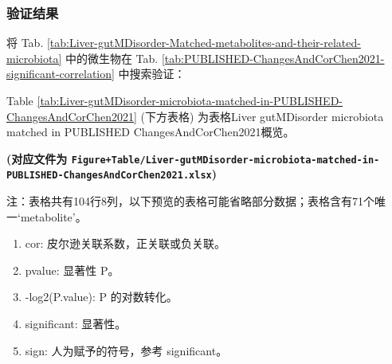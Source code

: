 \documentclass[
]{article}
\providecommand{\tightlist}{%
  \setlength{\itemsep}{0pt}\setlength{\parskip}{0pt}}
\begin{document}
\hypertarget{ux9a8cux8bc1ux7ed3ux679c}{%
\subsubsection{验证结果}\label{ux9a8cux8bc1ux7ed3ux679c}}

将 Tab. \ref{tab:Liver-gutMDisorder-Matched-metabolites-and-their-related-microbiota} 中的微生物在 Tab. \ref{tab:PUBLISHED-ChangesAndCorChen2021-significant-correlation} 中搜索验证：

Table \ref{tab:Liver-gutMDisorder-microbiota-matched-in-PUBLISHED-ChangesAndCorChen2021} (下方表格) 为表格Liver gutMDisorder microbiota matched in PUBLISHED ChangesAndCorChen2021概览。

\textbf{(对应文件为 \texttt{Figure+Table/Liver-gutMDisorder-microbiota-matched-in-PUBLISHED-ChangesAndCorChen2021.xlsx})}

\begin{center}\begin{tcolorbox}[colback=gray!10, colframe=gray!50, width=0.9\linewidth, arc=1mm, boxrule=0.5pt]注：表格共有104行8列，以下预览的表格可能省略部分数据；表格含有71个唯一`metabolite'。
\end{tcolorbox}
\end{center}
\begin{center}\begin{tcolorbox}[colback=gray!10, colframe=gray!50, width=0.9\linewidth, arc=1mm, boxrule=0.5pt]\begin{enumerate}\tightlist
\item cor:  皮尔逊关联系数，正关联或负关联。
\item pvalue:  显著性 P。
\item -log2(P.value):  P 的对数转化。
\item significant:  显著性。
\item sign:  人为赋予的符号，参考 significant。
\end{enumerate}\end{tcolorbox}
\end{center}
\end{document}
